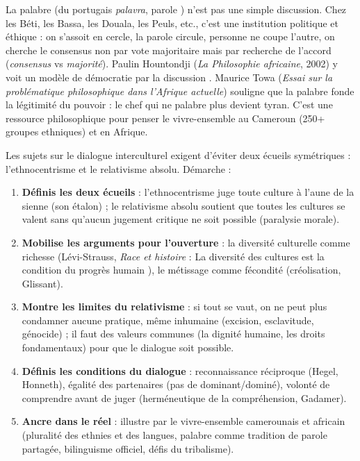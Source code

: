 \documentclass[11pt]{article}
\newcommand{\cle}[1]{{\popxbold\color{popdark}#1}}
\newcounter{popsec}
\newcounter{popsub}
\newcommand{\courssub}[1]{%
  \stepcounter{popsub}%
  \par\vspace{9pt}\noindent{\popxbold\fontsize{11.5}{13}\selectfont\color{popink}{\color{poporange}\thepopsec.\thepopsub}\hspace{6pt}#1}\par\nopagebreak\vspace{4pt}
}
\begin{document}
\courssub{Le dialogue interculturel}

\begin{savaistu}
La \cle{palabre} (du portugais \emph{palavra}, \guillemotleft parole \guillemotright) n'est pas une simple discussion. Chez les Béti, les Bassa, les Douala, les Peuls, etc., c'est une institution politique et éthique : on s'assoit en cercle, la parole circule, personne ne coupe l'autre, on cherche le consensus non par vote majoritaire mais par \cle{recherche de l'accord} (\emph{consensus} vs \emph{majorité}). Paulin Hountondji (\emph{La Philosophie africaine}, 2002) y voit un modèle de \guillemotleft démocratie par la discussion \guillemotright. Maurice Towa (\emph{Essai sur la problématique philosophique dans l'Afrique actuelle}) souligne que la palabre fonde la \cle{légitimité} du pouvoir : le chef qui ne palabre plus devient tyran. C'est une ressource philosophique pour penser le \cle{vivre-ensemble} au Cameroun (250+ groupes ethniques) et en Afrique.
\end{savaistu}

\begin{methode}
Les sujets sur le dialogue interculturel exigent d'éviter deux écueils symétriques : l'\cle{ethnocentrisme} et le \cle{relativisme absolu}. Démarche :
\begin{enumerate}
\item \textbf{Définis les deux écueils} : l'ethnocentrisme juge toute culture à l'aune de la sienne (son étalon) ; le relativisme absolu soutient que toutes les cultures se valent sans qu'aucun jugement critique ne soit possible (paralysie morale).
\item \textbf{Mobilise les arguments pour l'ouverture} : la diversité culturelle comme richesse (Lévi-Strauss, \emph{Race et histoire} : \guillemotleft La diversité des cultures est la condition du progrès humain \guillemotright), le métissage comme fécondité (créolisation, Glissant).
\item \textbf{Montre les limites du relativisme} : si tout se vaut, on ne peut plus condamner aucune pratique, même inhumaine (excision, esclavitude, génocide) ; il faut des \cle{valeurs communes} (la dignité humaine, les droits fondamentaux) pour que le dialogue soit possible.
\item \textbf{Définis les conditions du dialogue} : reconnaissance réciproque (Hegel, Honneth), égalité des partenaires (pas de dominant/dominé), volonté de comprendre avant de juger (herméneutique de la compréhension, Gadamer).
\item \textbf{Ancre dans le réel} : illustre par le vivre-ensemble camerounais et africain (pluralité des ethnies et des langues, palabre comme tradition de parole partagée, bilinguisme officiel, défis du tribalisme).
\end{enumerate}
\end{methode}
\end{document}
